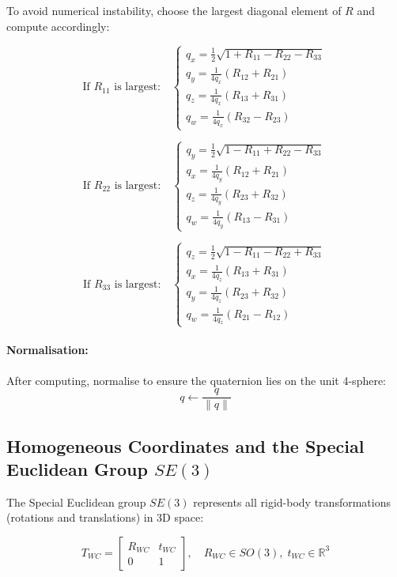 \documentclass[11pt,a4paper]{article}
\begin{document}
To avoid numerical instability, choose the largest diagonal element of \(R\) and compute accordingly:

\[
\text{If } R_{11} \text{ is largest:}
\quad
\begin{cases}
q_x = \tfrac{1}{2}\sqrt{1 + R_{11} - R_{22} - R_{33}} \\
q_y = \tfrac{1}{4q_x}(R_{12} + R_{21}) \\
q_z = \tfrac{1}{4q_x}(R_{13} + R_{31}) \\
q_w = \tfrac{1}{4q_x}(R_{32} - R_{23})
\end{cases}
\]

\[
\text{If } R_{22} \text{ is largest:}
\quad
\begin{cases}
q_y = \tfrac{1}{2}\sqrt{1 - R_{11} + R_{22} - R_{33}} \\
q_x = \tfrac{1}{4q_y}(R_{12} + R_{21}) \\
q_z = \tfrac{1}{4q_y}(R_{23} + R_{32}) \\
q_w = \tfrac{1}{4q_y}(R_{13} - R_{31})
\end{cases}
\]

\[
\text{If } R_{33} \text{ is largest:}
\quad
\begin{cases}
q_z = \tfrac{1}{2}\sqrt{1 - R_{11} - R_{22} + R_{33}} \\
q_x = \tfrac{1}{4q_z}(R_{13} + R_{31}) \\
q_y = \tfrac{1}{4q_z}(R_{23} + R_{32}) \\
q_w = \tfrac{1}{4q_z}(R_{21} - R_{12})
\end{cases}
\]

\paragraph{Normalisation:}
After computing, normalise to ensure the quaternion lies on the unit 4-sphere:
\[
q \leftarrow \frac{q}{\|q\|}
\]

\subsection*{Homogeneous Coordinates and the Special Euclidean Group \( SE(3) \)}

The Special Euclidean group \( SE(3) \) represents all rigid-body transformations (rotations and translations) in 3D space:

\[
T_{WC} =
\begin{bmatrix}
R_{WC} & t_{WC} \\
0 & 1
\end{bmatrix}, \quad
R_{WC} \in SO(3), \; t_{WC} \in \mathbb{R}^3
\]
\end{document}
